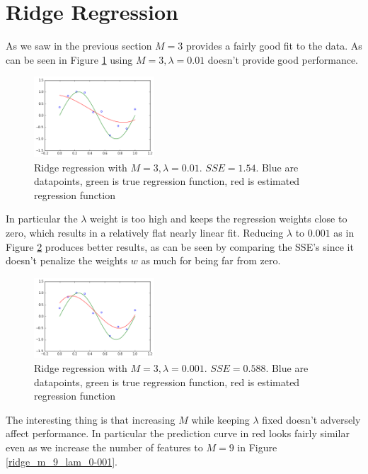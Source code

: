 \documentclass[10pt]{article}
\begin{document}

\section{Ridge Regression}
As we saw in the previous section $M = 3$ provides a fairly good fit to the data. As can be seen in Figure \ref{ridge_m_3_lam_0-01} using $M = 3, \lambda = 0.01$ doesn't provide good performance.

\begin{figure}[h]
\centering
\includegraphics[width=0.4\textwidth]{m_3_lam_0-01}
\caption{Ridge regression with $M = 3, \lambda = 0.01$. $SSE = 1.54$. Blue are datapoints, green is true regression function, red is estimated regression function}
\label{ridge_m_3_lam_0-01}
\end{figure} 
In particular the $\lambda$ weight is too high and keeps the regression weights close to zero, which results in a relatively flat nearly linear fit. Reducing $\lambda $ to $0.001$ as in Figure \ref{ridge_m_3_lam_0-001} produces better results, as can be seen by comparing the SSE's since it doesn't penalize the weights $w$ as much for being far from zero.
%
\begin{figure}[h]
\centering
\includegraphics[width=0.4\textwidth]{m_3_lam_0-001}
\caption{Ridge regression with $M = 3, \lambda = 0.001$. $SSE = 0.588$. Blue are datapoints, green is true regression function, red is estimated regression function}
\label{ridge_m_3_lam_0-001}
\end{figure}
%
The interesting thing is that increasing $M$ while keeping $\lambda$ fixed doesn't adversely affect performance. In particular the prediction curve in red looks fairly similar even as we increase the number of features to $M = 9$ in Figure \ref{ridge_m_9_lam_0-001}. 
\end{document}
